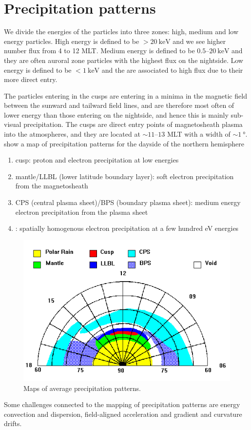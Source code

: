 \section{Precipitation patterns}
We divide the energies of the particles into three zones: high, medium and low energy particles. High energy is defined to be \(>\SI{20}{\kilo\electronvolt}\) and we see higher number flux from 4 to 12 MLT\@. Medium energy is defined to be \(0.5\)--\(\SI{20}{\kilo\electronvolt}\) and they are often auroral zone particles with the highest flux on the nightside. Low energy is defined to be \(<\SI{1}{\kilo\electronvolt}\) and the are associated to high flux due to their more direct entry.

The particles entering in the cusps are entering in a minima in the magnetic field between the sunward and tailward field lines, and are therefore most often of lower energy than those entering on the nightside, and hence this is mainly sub-visual precipitation. The cusps are direct entry points of magnetosheath plasma into the atmospheres, and they are located at \(\sim 11\)--\(13\) MLT with a width of \(\sim\SI{1}{\degree}\).  show a map of precipitation patterns for the dayside of the northern hemisphere
\begin{enumerate}[\(\bullet \)]
    \item {\color{red}cusp}: proton and electron precipitation at low energies
    \item {\color{green}mantle}/{\color{blue}LLBL} (lower latitude boundary layer): soft electron precipitation from the magnetosheath
    \item {\color{cyan}CPS} (central plasma sheet)/{\color{blue!50}BPS} (boundary plasma sheet): medium energy electron precipitation from the plasma sheet
    \item \textcolor{yellow}{}: spatially homogenous electron precipitation at a few hundred \si{\electronvolt} energies
\end{enumerate}
\begin{figure}[t]
    \centering
    \includegraphics[width=.6\linewidth]{bilder/L4_maps_precipitation_pattern.png}
    \caption{Maps of average precipitation patterns.}\label{fig:L4_maps_precipitation_pattern}
\end{figure}
Some challenges connected to the mapping of precipitation patterns are energy convection and dispersion, field-aligned acceleration and gradient and curvature drifts.


